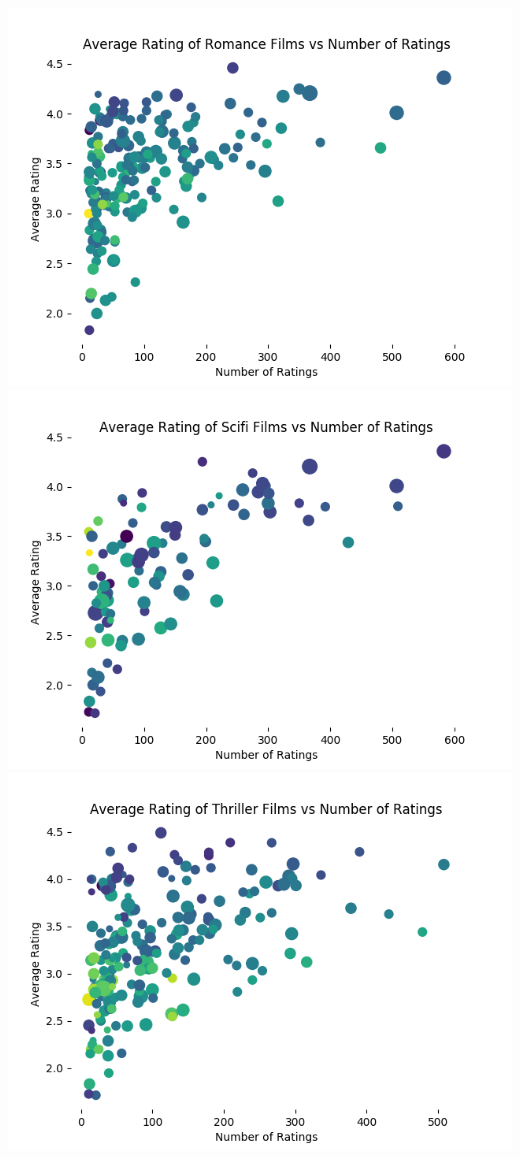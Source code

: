 \begin{itemize}
\begin{center}
    \includegraphics[scale=.3]{basic_4_romance.png} 
    \includegraphics[scale=.3]{basic_4_scifi.png}
    \includegraphics[scale=.3]{basic_4_thriller.png}
  \end{center}
\end{itemize}


